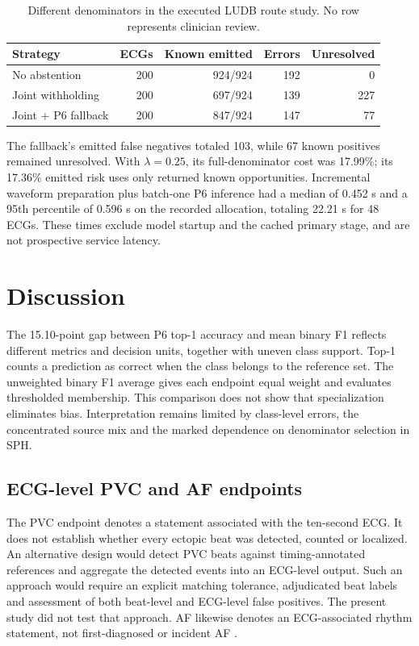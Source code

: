 \documentclass[life,article,submit,moreauthors]{Definitions/mdpi}
\begin{document}
\begin{table}[tbp]
\caption{Different denominators in the executed LUDB route study. No row represents clinician review.\label{tab:route-comparison}\label{tab:uncertainty_quarantine}}
\centering\small
\begin{tabular}{@{}p{.31\linewidth}rrrr@{}}
\toprule
Strategy & ECGs & Known emitted & Errors & Unresolved \\
\midrule
No abstention & 200 & 924/924 & 192 & 0 \\
Joint withholding & 200 & 697/924 & 139 & 227 \\
Joint + P6 fallback & 200 & 847/924 & 147 & 77 \\
\bottomrule
\end{tabular}
\end{table}

The fallback's emitted false negatives totaled 103, while 67 known positives remained unresolved. With $\lambda=0.25$, its full-denominator cost was 17.99\%; its 17.36\% emitted risk uses only returned known opportunities. Incremental waveform preparation plus batch-one P6 inference had a median of 0.452 s and a 95th percentile of 0.596 s on the recorded allocation, totaling 22.21 s for 48 ECGs. These times exclude model startup and the cached primary stage, and are not prospective service latency.





\section{Discussion}


The 15.10-point gap between P6 top-1 accuracy and mean binary F1 reflects different metrics and decision units, together with uneven class support. Top-1 counts a prediction as correct when the class belongs to the reference set. The unweighted binary F1 average gives each endpoint equal weight and evaluates thresholded membership. This comparison does not show that specialization eliminates bias. Interpretation remains limited by class-level errors, the concentrated source mix and the marked dependence on denominator selection in SPH.

\subsection{ECG-level PVC and AF endpoints}
\label{sec:pvc}
The PVC endpoint denotes a statement associated with the ten-second ECG. It does not establish whether every ectopic beat was detected, counted or localized. An alternative design would detect PVC beats against timing-annotated references and aggregate the detected events into an ECG-level output. Such an approach would require an explicit matching tolerance, adjudicated beat labels and assessment of both beat-level and ECG-level false positives. The present study did not test that approach. AF likewise denotes an ECG-associated rhythm statement, not first-diagnosed or incident AF \citep{Rossi2026AF}.
\end{document}
